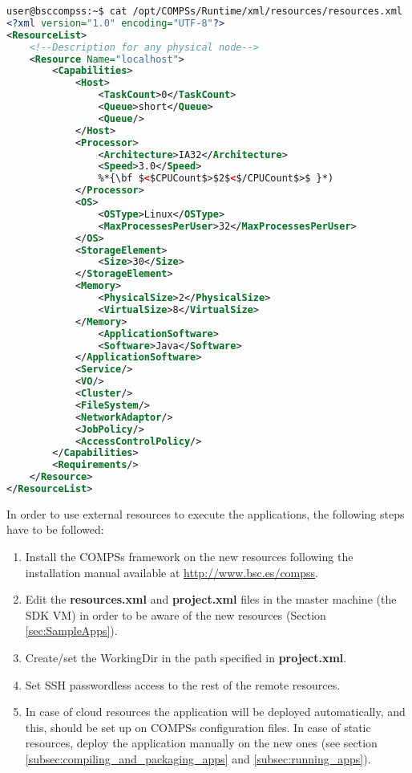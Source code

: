 \begin{lstlisting}[language=xml]
user@bsccompss:~$ cat /opt/COMPSs/Runtime/xml/resources/resources.xml
<?xml version="1.0" encoding="UTF-8"?>
<ResourceList>
    <!--Description for any physical node-->
    <Resource Name="localhost">
        <Capabilities>
            <Host>
                <TaskCount>0</TaskCount>
                <Queue>short</Queue>
                <Queue/>
            </Host>
            <Processor>
                <Architecture>IA32</Architecture>
                <Speed>3.0</Speed>
                %*{\bf $<$CPUCount$>$2$<$/CPUCount$>$ }*)
            </Processor>
            <OS>
                <OSType>Linux</OSType>
                <MaxProcessesPerUser>32</MaxProcessesPerUser>
            </OS>
            <StorageElement>
                <Size>30</Size>
            </StorageElement>
            <Memory>
                <PhysicalSize>2</PhysicalSize>
                <VirtualSize>8</VirtualSize>
            </Memory>
                <ApplicationSoftware>
                <Software>Java</Software>
            </ApplicationSoftware>
            <Service/>
            <VO/>
            <Cluster/>
            <FileSystem/>
            <NetworkAdaptor/>
            <JobPolicy/>
            <AccessControlPolicy/>
        </Capabilities>
        <Requirements/>
    </Resource>
</ResourceList>
\end{lstlisting}
     
In order to use external resources to execute the applications, the following steps have to be followed:

\begin{enumerate}
 \item Install the COMPSs framework on the new resources following the installation manual 
       available at \url{http://www.bsc.es/compss}.
 \item Edit the {\bf resources.xml} and {\bf project.xml} files in the master machine (the SDK VM) in 
       order to be aware of the new resources (Section \ref{sec:SampleApps}).
 \item Create/set the WorkingDir in the path specified in {\bf project.xml}.
 \item Set SSH passwordless access to the rest of the remote resources.
 \item In case of cloud resources the application will be deployed automatically, and this, should be 
       set up on COMPSs configuration files. In case of static resources, deploy the  application manually 
       on the new ones (see section \ref{subsec:compiling_and_packaging_apps} and \ref{subsec:running_apps}).
\end{enumerate}

